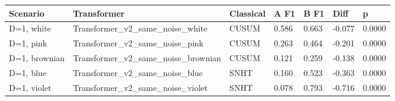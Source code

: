 \begin{tabular}{lllllll}
\toprule
Scenario & Transformer & Classical & A F1 & B F1 & Diff & p \\
\midrule
D=1, white & Transformer\_v2\_same\_noise\_white & CUSUM & 0.586 & 0.663 & -0.077 & 0.0000 \\
D=1, pink & Transformer\_v2\_same\_noise\_pink & CUSUM & 0.263 & 0.464 & -0.201 & 0.0000 \\
D=1, brownian & Transformer\_v2\_same\_noise\_brownian & CUSUM & 0.121 & 0.259 & -0.138 & 0.0000 \\
D=1, blue & Transformer\_v2\_same\_noise\_blue & SNHT & 0.160 & 0.523 & -0.363 & 0.0000 \\
D=1, violet & Transformer\_v2\_same\_noise\_violet & SNHT & 0.078 & 0.793 & -0.716 & 0.0000 \\
\bottomrule
\end{tabular}
